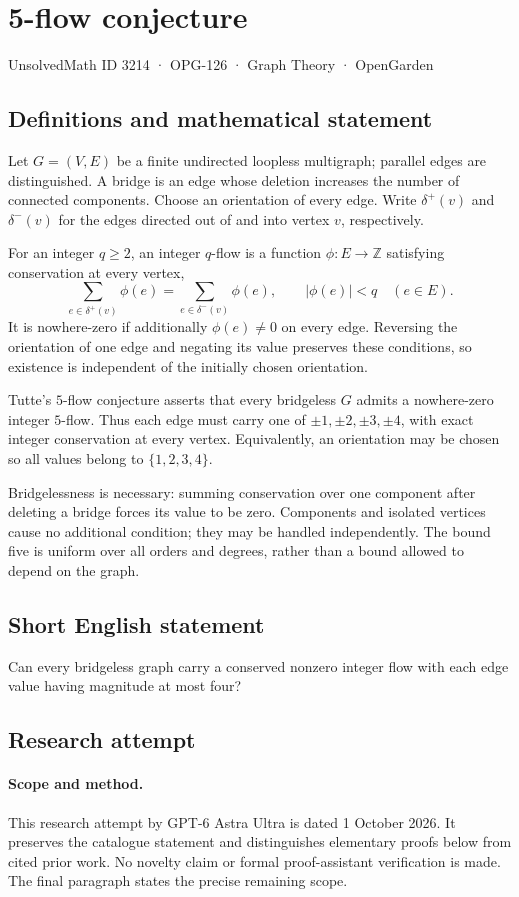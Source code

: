 \documentclass[11pt,a4paper]{article}
\begin{document}
\section*{5-flow conjecture}\label{3214}
{\small UnsolvedMath ID 3214 · OPG-126 · Graph Theory · OpenGarden}
\subsection{Definitions and mathematical statement}
Let $G=(V,E)$ be a finite undirected
loopless multigraph; parallel edges
are distinguished. A bridge is an
edge whose deletion increases the
number of connected components.
Choose an orientation of every edge.
Write $\delta^+(v)$ and $\delta^-(v)$
for the edges directed out of and
into vertex $v$, respectively.

For an integer $q\geq2$, an integer
$q$-flow is a function $\phi:E\to\mathbb Z$
satisfying conservation at every vertex,
\[
 \sum_{e\in\delta^+(v)}\phi(e)
 =\sum_{e\in\delta^-(v)}\phi(e),
 \qquad |\phi(e)|<q\quad(e\in E).
\]
It is nowhere-zero if additionally
$\phi(e)\neq0$ on every edge.
Reversing the orientation of one
edge and negating its value preserves
these conditions, so existence is
independent of the initially chosen
orientation.

Tutte's $5$-flow conjecture asserts
that every bridgeless $G$ admits a
nowhere-zero integer $5$-flow. Thus
each edge must carry one of
$\pm1,\pm2,\pm3,\pm4$, with exact
integer conservation at every vertex.
Equivalently, an orientation may be
chosen so all values belong to
$\{1,2,3,4\}$.

Bridgelessness is necessary: summing
conservation over one component after
deleting a bridge forces its value
to be zero. Components and isolated
vertices cause no additional condition;
they may be handled independently.
The bound five is uniform over all
orders and degrees, rather than a
bound allowed to depend on the graph.
\subsection{Short English statement}
Can every bridgeless graph carry a conserved nonzero integer flow with each edge value having magnitude at most four?
\subsection{Research attempt}
\paragraph{Scope and method.}
This research attempt by GPT-6 Astra Ultra is dated 1 October 2026.
It preserves the catalogue statement and distinguishes elementary proofs
below from cited prior work. No novelty claim or formal proof-assistant
verification is made. The final paragraph states the precise remaining scope.
\end{document}
